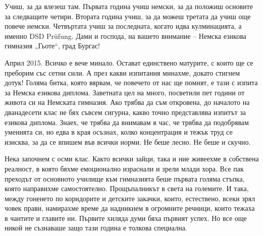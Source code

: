 \begin{multicols}{3}

Учиш, за да влезеш там. Първата година учиш немски, за да положиш основите за следващите четири. Втората година учиш, за да можеш третата да учиш още повече немски. Четвъртата учиш за последната, когато идва кулминацията, а именно  DSD Prüfung. Дами и господа, на вашето внимание – Немска езикова гимназия „Гьоте“, град Бургас!

Април 2015. Всичко е вече минало. Остават единствено матурите, с които ще се преборим със сетни сили. А през какви изпитания минахме, докато стигнем дотук! Голяма битка, която вярвам, че повечето от нас ще помнят, е тази с изпита за Немска езикова диплома. Заветната цел на много, посветили пет години от живота си на Немската гимназия. Ако трябва да съм  откровена, до началото на дванадесети клас не бях съвсем сигурна,  какво точно представлява изпитът за езикова диплома. Знаех, че трябва да внимавам в час, че трябва да подобрявам уменията си, но едва в края осъзнах, колко концентрация и тежък труд се изисква, за да се впишем във всички норми. Не беше лесно. Не беше и скучно. 

Нека започнем с осми клас. Както всички зайци, така и ние живеехме в собствена реалност, в която бяхме емоционално израснали и зрели млади хора. Все пак преходът от основното училище към гимназията беше първата голяма стъпка, която направихме самостоятелно. Прощъпалникът в света на големите. И така, между 
гоненето по коридорите и детските закачки, които, естествено, всеки зрял човек прави, намирахме време да надникнем в огромните речници, които тежаха в чантите и главите ни. Първите хиляда думи бяха първият успех. Но все още никой не съзнаваше защо тази година е толкова специална.


\end{multicols}
